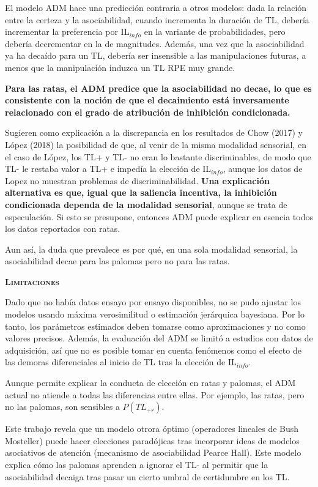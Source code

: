 \documentclass[a4paper,12pt]{article}
\begin{document}
El modelo ADM hace una predicción contraria a otros modelos: dada la relación entre la certeza y la asociabilidad, cuando incrementa la duración de TL, debería incrementar la preferencia por IL$_{info}$ en la variante de probabilidades, pero debería decrementar en la de magnitudes. Además, una vez que la asociabilidad ya ha decaído para un TL, debería ser insensible a las manipulaciones futuras, a menos que la manipulación induzca un TL RPE muy grande.

{\bfseries Para las ratas, el ADM predice que la asociabilidad no decae, lo que es consistente con la noción de que el decaimiento está inversamente relacionado con el grado de atribución de inhibición condicionada.}

Sugieren como explicación a la discrepancia en los resultados de Chow (2017) y López (2018) la posibilidad de que, al venir de la misma modalidad sensorial, en el caso de López, los TL+ y TL- no eran lo bastante discriminables, de modo que TL- le restaba valor a TL+ e impedía la elección de IL$_{info}$, aunque los datos de Lopez no muestran problemas de discriminabilidad. {\bfseries Una explicación alternativa es que, igual que la saliencia incentiva, la inhibición condicionada dependa de la modalidad sensorial}, aunque se trata de especulación. Si esto se presupone, entonces ADM puede explicar en esencia todos los datos reportados con ratas.

Aun así, la duda que prevalece es por qué, en una sola modalidad sensorial, la asociabilidad decae para las palomas pero no para las ratas.

{\scshape\bfseries Limitaciones}

Dado que no había datos ensayo por ensayo disponibles, no se pudo ajustar los modelos usando máxima verosimilitud o estimación jerárquica bayesiana. Por lo tanto, los parámetros estimados deben tomarse como aproximaciones y no como valores precisos. Además, la evaluación del ADM se limitó a estudios con datos de adquisición, así que no es posible tomar en cuenta fenómenos como el efecto de las demoras diferenciales al inicio de TL tras la elección de IL$_{info}$.

Aunque permite explicar la conducta de elección en ratas y palomas, el ADM actual no atiende a todas las diferencias entre ellas. Por ejemplo, las ratas, pero no las palomas, son sensibles a $P(TL_{+r})$. 

Este trabajo revela que un modelo otrora óptimo (operadores lineales de Bush Mosteller) puede hacer elecciones paradójicas tras incorporar ideas de modelos asociativos de atención (mecanismo de asociabilidad Pearce Hall). Este modelo explica cómo las palomas aprenden a ignorar el TL- al permitir que la asociabilidad decaiga tras pasar un cierto umbral de certidumbre en los TL. 
\end{document}
